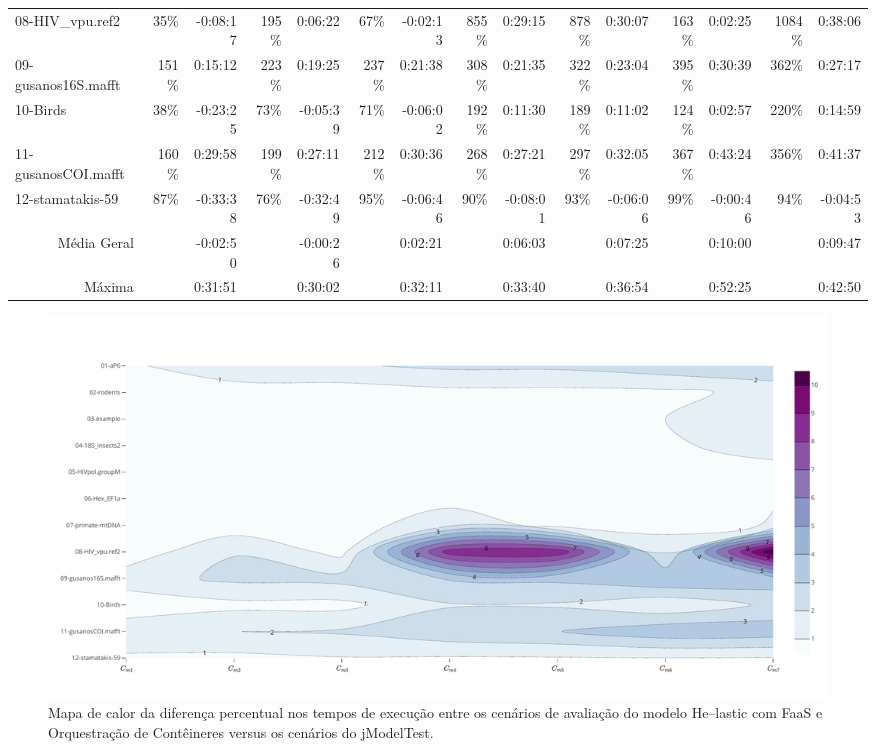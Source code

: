 \documentclass[english,brazilian]{UNISINOSmonografia} %
\begin{document}
{\begin{landscape}
\begin{table}
\begin{minipage}{\linewidth}
\begin{tabularx}{\linewidth}{@{\extracolsep{\fill}}lrrrrrrrrrrrrrr@{}}
			08-HIV\_vpu.ref2 & 35\% & -0:08:17 & 195\% & 0:06:22 & 67\% & -0:02:13 & 855\% & 0:29:15 & 878\% & 0:30:07 & 163\% & 0:02:25 & 1084\% & 0:38:06 \\
			09-gusanos16S.mafft & 151\% & 0:15:12 & 223\% & 0:19:25 & 237\% & 0:21:38 & 308\% & 0:21:35 & 322\% & 0:23:04 & 395\% & 0:30:39 & 362\% & 0:27:17 \\
			10-Birds & 38\% & -0:23:25 & 73\% & -0:05:39 & 71\% & -0:06:02 & 192\% & 0:11:30 & 189\% & 0:11:02 & 124\% & 0:02:57 & 220\% & 0:14:59 \\
			11-gusanosCOI.mafft & 160\% & 0:29:58 & 199\% & 0:27:11 & 212\% & 0:30:36 & 268\% & 0:27:21 & 297\% & 0:32:05 & 367\% & 0:43:24 & 356\% & 0:41:37 \\
			12-stamatakis-59 & 87\% & -0:33:38 & 76\% & -0:32:49 & 95\% & -0:06:46 & 90\% & -0:08:01 & 93\% & -0:06:06 & 99\% & -0:00:46 & 94\% & -0:04:53 \\ 
			\bottomrule
			\multicolumn{1}{r}{Média Geral} &  & \textcolor{success-green}{-0:02:50} &  & -0:00:26 &  & 0:02:21 &  & 0:06:03 &  & 0:07:25 &  & \textcolor{failure-red}{0:10:00} &  & 0:09:47 \\
			\multicolumn{1}{r}{Máxima} &  & 0:31:51 &  & \textcolor{success-green}{0:30:02} &  & 0:32:11 &  & 0:33:40 &  & 0:36:54 &  & \textcolor{failure-red}{0:52:25} &  & 0:42:50
		\end{tabularx}
	\end{minipage}
\end{table}

\begin{figure}[p]
	\centering%
	\begin{minipage}{\linewidth}
		\caption{Mapa de calor da diferença percentual nos tempos de execução entre os cenários de avaliação do modelo \textsf{He}--lastic com FaaS e Orquestração de Contêineres versus os cenários do jModelTest.}
		\label{fig:results-modelo-mixed}
		\vspace{1ex}
		\includegraphics[trim=0 38 0 70,clip,width=\textwidth]{results-modelo-mixed}
	\end{minipage}
\end{figure}

\end{landscape}
}
\end{document}
